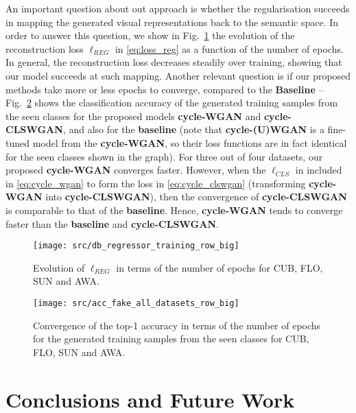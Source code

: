 \documentclass[runningheads]{llncs}
\begin{document}
An important question about out approach is whether the regularisation succeeds in mapping the generated visual representations back to the semantic space.  In order to answer this question, we show in Fig.~\ref{fig:sun_regressor} the evolution of the reconstruction loss $\ell_{REG}$ in \eqref{eq:loss_reg} as a function of the number of epochs.  In general, the reconstruction loss decreases steadily over training, showing that our model succeeds at such mapping.
Another relevant question is if our proposed methods take more or less epochs to converge, compared to the \textbf{Baseline} -- Fig.~\ref{fig:fake_acc} shows the classification accuracy of the generated training samples from the seen classes for the proposed models \textbf{cycle-WGAN} and \textbf{cycle-CLSWGAN}, and also for the \textbf{baseline} (note that \textbf{cycle-(U)WGAN} is a fine-tuned model from the \textbf{cycle-WGAN}, so their loss functions are in fact identical for the seen classes shown in the graph).  For three out of four datasets, our proposed \textbf{cycle-WGAN} converges faster. However, when the $\ell_{CLS}$ in included in \eqref{eq:cycle_wgan} to form the loss in \eqref{eq:cycle_clswgan} (transforming \textbf{cycle-WGAN} into \textbf{cycle-CLSWGAN}), then the convergence of \textbf{cycle-CLSWGAN} is comparable to that of the \textbf{baseline}.  Hence, \textbf{cycle-WGAN} tends to converge faster than the \textbf{baseline} and \textbf{cycle-CLSWGAN}.

\begin{figure}[t]
\centering
\texttt{[image: src/db\_regressor\_training\_row\_big]}
\caption{Evolution of $\ell_{REG}$ in terms of the number of epochs for CUB, FLO, SUN and AWA.}
\label{fig:sun_regressor}
\end{figure}

\begin{figure}[t]
\centering
	\texttt{[image: src/acc\_fake\_all\_datasets\_row\_big]}
 	\caption{Convergence of the top-1 accuracy in terms of the number of epochs for the generated training samples from the seen classes for CUB, FLO, SUN and AWA.}
    \label{fig:fake_acc}
\end{figure}

%
%
%
%
%
%
%

\section{Conclusions and Future Work}
\end{document}
